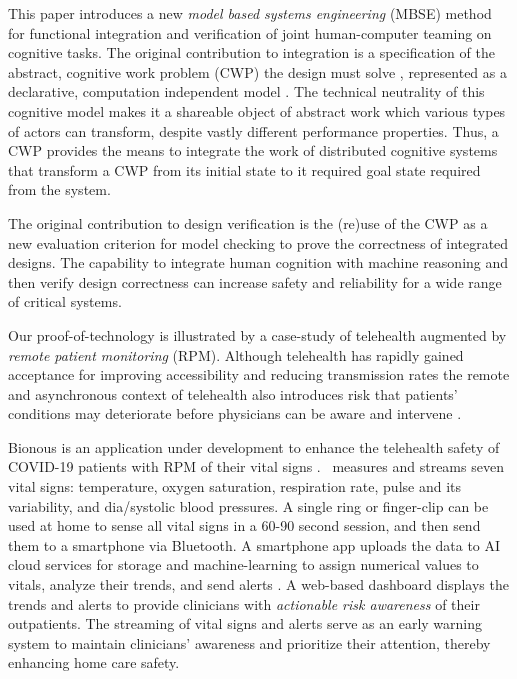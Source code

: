 This paper introduces a new \emph{model based systems engineering} (MBSE) method for functional integration and verification of joint human-computer teaming on cognitive tasks. 
The original contribution to integration is a specification of the abstract, cognitive work problem (CWP) the design must solve \cite{workflowmodel,workcentered,BERRY201615,chi2010}, represented as a declarative, computation independent model \cite{Garrido}.
The technical neutrality of this cognitive model makes it a shareable object of abstract work which various types of actors can transform, despite vastly different performance properties.
Thus, a CWP provides the means to integrate the work of distributed cognitive systems that transform a CWP from its initial state to it required goal state required from the system.

The original contribution to design verification is the (re)use of the CWP as a new evaluation criterion for model checking to prove the correctness of integrated designs.
The capability to integrate human cognition with machine reasoning and then verify design correctness can increase safety and reliability for a wide range of critical systems.

Our proof-of-technology is illustrated by a case-study of telehealth augmented by \emph{remote patient monitoring} (RPM). 
Although telehealth has rapidly gained acceptance for improving accessibility \cite{Medicare} and reducing transmission rates \cite{10.1093/jamia/ocaa067} the remote and asynchronous context of telehealth also introduces risk that patients' conditions may deteriorate before physicians can be aware and intervene \cite{10.1097/ALN.0000000000003578}.

Bionous \phware is an application under development to enhance the telehealth safety of COVID-19 patients with RPM of their vital signs \cite{Phware}.
\phware\ measures and streams seven vital signs: temperature, oxygen saturation, respiration rate, pulse and its variability, and dia/systolic blood pressures.
A single \phware ring or finger-clip can be used at home to sense all vital signs in a 60-90 second session, and then send them to a smartphone via Bluetooth.
A smartphone app uploads the data to AI cloud services for storage and machine-learning to assign numerical values to vitals, analyze their trends, and send alerts \cite{Altschul2004PredictiveMI,10.2307/2984877,10.5555/1643031.1643047}.
A web-based dashboard displays the trends and alerts to provide clinicians with \emph{actionable risk awareness} of their outpatients.
The streaming of vital signs and alerts serve as an early warning system to maintain clinicians’ awareness and prioritize their attention, thereby enhancing home care safety.

